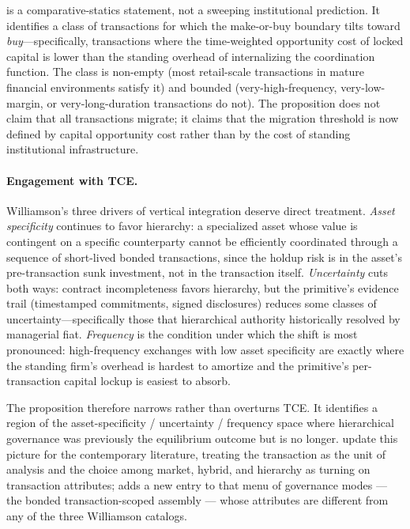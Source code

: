 \documentclass[11pt,a4paper]{article}
\theoremstyle{definition}
\theoremstyle{remark}
\begin{document}
 is a comparative-statics statement, not a
sweeping institutional prediction. It identifies a class of
transactions for which the make-or-buy boundary tilts toward
\emph{buy}---specifically, transactions where the time-weighted
opportunity cost of locked capital is lower than the standing
overhead of internalizing the coordination function. The class is
non-empty (most retail-scale transactions in mature financial
environments satisfy it) and bounded (very-high-frequency,
very-low-margin, or very-long-duration transactions do not). The
proposition does not claim that all transactions migrate; it claims
that the migration threshold is now defined by capital opportunity
cost rather than by the cost of standing institutional infrastructure.

\paragraph{Engagement with TCE.}
Williamson's three drivers of vertical integration deserve direct
treatment. \emph{Asset specificity} continues to favor hierarchy: a
specialized asset whose value is contingent on a specific
counterparty cannot be efficiently coordinated through a sequence of
short-lived bonded transactions, since the holdup risk is in the
asset's pre-transaction sunk investment, not in the transaction
itself. \emph{Uncertainty} cuts both ways: contract incompleteness
favors hierarchy, but the primitive's evidence trail (timestamped
commitments, signed disclosures) reduces some classes of
uncertainty---specifically those that hierarchical authority
historically resolved by managerial fiat. \emph{Frequency} is the
condition under which the shift is most pronounced: high-frequency
exchanges with low asset specificity are exactly where the standing
firm's overhead is hardest to amortize and the primitive's
per-transaction capital lockup is easiest to absorb.

The proposition therefore narrows rather than overturns TCE. It
identifies a region of the asset-specificity / uncertainty /
frequency space where hierarchical governance was previously the
equilibrium outcome but is no longer. \citet{tadelis_williamson_2013}
update this picture for the contemporary literature, treating the
transaction as the unit of analysis and the choice among market,
hybrid, and hierarchy as turning on transaction attributes;
 adds a new entry to that menu of
governance modes --- the bonded transaction-scoped assembly --- whose
attributes are different from any of the three Williamson catalogs.
\end{document}
